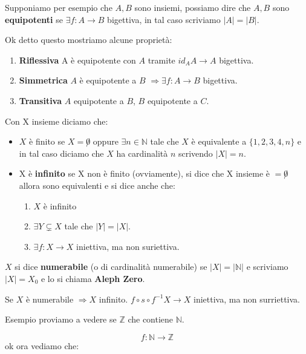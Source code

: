 \documentclass{article}
\begin{document}
Supponiamo per esempio che $A,B$ sono insiemi, possiamo dire che $A,B$ sono \textbf{equipotenti} se $\exists f:A \rightarrow B$ bigettiva, in tal caso scriviamo $|A| = |B|$. \par

Ok detto questo mostriamo alcune proprietà:
\begin{enumerate}
        \item \textbf{Riflessiva} A è equipotente con $A$ tramite $id_A A \rightarrow A$ bigettiva.
        \item \textbf{Simmetrica} $A$ è equipotente a $B$ $\Rightarrow \exists f:A \rightarrow B$ bigettiva. 
        \item \textbf{Transitiva} $A$ equipotente a $B$, $B$ equipotente a $C$.	
\end{enumerate}

Con X insieme diciamo che:
\begin{itemize}
        \item $X$ è finito se $X = \not 0$ oppure $\exists n \in \mathbb{N}$ tale che $X$ è equivalente a $\{1,2,3,4,n\}$ e in tal caso diciamo che $X$ ha cardinalità $n$ scrivendo $|X| = n$.
        \item X è \textbf{infinito} se X non è finito (ovviamente), si dice che X insieme è $= \not 0$ allora sono equivalenti e si dice anche che:
        \begin{enumerate}
                \item$X$ è infinito
                \item $\exists Y \subsetneq X$ tale che $|Y|=|X|$.
                \item $\exists f:X \to X$ iniettiva, ma non suriettiva.
        \end{enumerate}
\end{itemize}

$X$ si dice \textbf{numerabile} (o di cardinalità numerabile) se $|X| = |\mathbb{N}|$ e scriviamo $|X| = X_0$ e lo si chiama \textbf{Aleph Zero}. \par
Se $X$ è numerabile $\Rightarrow X$ infinito. \newline
$f \circ s \circ f^{-1} X \rightarrow X$ iniettiva, ma non surriettiva.

Esempio proviamo a vedere se $\mathbb{Z}$ che contiene $\mathbb{N}$. \par
\begin{equation}
        f : \mathbb{N} \rightarrow \mathbb{Z}
\end{equation}
ok ora vediamo che: \newline
\end{document}
